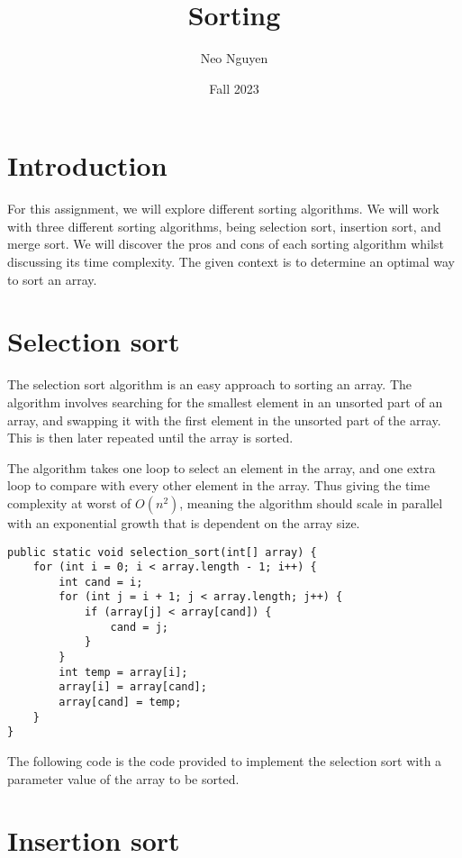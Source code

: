 \documentclass[a4paper,11pt]{article}
\begin{document}
\title{
    \textbf{Sorting}
}
\author{Neo Nguyen}
\date{Fall 2023}

\maketitle

\section*{Introduction}

    For this assignment, we will explore different sorting algorithms. We will work with three different sorting algorithms, being selection sort, insertion sort, and merge sort. We will discover the pros and cons of each sorting algorithm whilst discussing its time complexity. The given context is to determine an optimal way to sort an array.

\section*{Selection sort}

    The selection sort algorithm is an easy approach to sorting an array. The algorithm involves searching for the smallest element in an unsorted part of an array, and swapping it with the first element in the unsorted part of the array. This is then later repeated until the array is sorted.

    The algorithm takes one loop to select an element in the array, and one extra loop to compare with every other element in the array. Thus giving the time complexity at worst of $O(n^2)$, meaning the algorithm should scale in parallel with an exponential growth that is dependent on the array size.
\begin{verbatim}
public static void selection_sort(int[] array) {
    for (int i = 0; i < array.length - 1; i++) {
        int cand = i;
        for (int j = i + 1; j < array.length; j++) {
            if (array[j] < array[cand]) {
                cand = j;
            }
        }
        int temp = array[i];
        array[i] = array[cand];
        array[cand] = temp;
    }
}
\end{verbatim}
    The following code is the code provided to implement the selection sort with a parameter value of the array to be sorted. 

\section*{Insertion sort}
\end{document}
